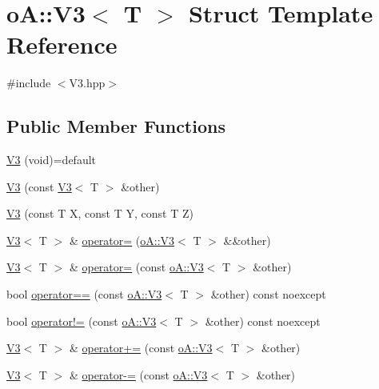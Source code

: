\hypertarget{structo_a_1_1_v3}{}\section{oA\+:\+:V3$<$ T $>$ Struct Template Reference}
\label{structo_a_1_1_v3}


{\ttfamily \#include $<$V3.\+hpp$>$}

\subsection*{Public Member Functions}
\begin{DoxyCompactItemize}
\item 
\mbox{\hyperlink{structo_a_1_1_v3_af7d2e9a3d4eecae6bdd7adf7dd1a691b}{V3}} (void)=default
\item 
\mbox{\hyperlink{structo_a_1_1_v3_a8020feb017daf4289ee5f1b06d3ff952}{V3}} (const \mbox{\hyperlink{structo_a_1_1_v3}{V3}}$<$ T $>$ \&other)
\item 
\mbox{\hyperlink{structo_a_1_1_v3_a528741444df16de6e4839338ec9d2cf0}{V3}} (const T X, const T Y, const T Z)
\item 
\mbox{\hyperlink{structo_a_1_1_v3}{V3}}$<$ T $>$ \& \mbox{\hyperlink{structo_a_1_1_v3_a87a850c59abfbf1ad9fbaa15865e24fe}{operator=}} (\mbox{\hyperlink{structo_a_1_1_v3}{o\+A\+::\+V3}}$<$ T $>$ \&\&other)
\item 
\mbox{\hyperlink{structo_a_1_1_v3}{V3}}$<$ T $>$ \& \mbox{\hyperlink{structo_a_1_1_v3_acd2b2489386aa3c917d2b843602da1a8}{operator=}} (const \mbox{\hyperlink{structo_a_1_1_v3}{o\+A\+::\+V3}}$<$ T $>$ \&other)
\item 
bool \mbox{\hyperlink{structo_a_1_1_v3_a1291b33d742ccbc7e5b30466c6baa50d}{operator==}} (const \mbox{\hyperlink{structo_a_1_1_v3}{o\+A\+::\+V3}}$<$ T $>$ \&other) const noexcept
\item 
bool \mbox{\hyperlink{structo_a_1_1_v3_ab5f276b206d63965cf0ce028af40363f}{operator!=}} (const \mbox{\hyperlink{structo_a_1_1_v3}{o\+A\+::\+V3}}$<$ T $>$ \&other) const noexcept
\item 
\mbox{\hyperlink{structo_a_1_1_v3}{V3}}$<$ T $>$ \& \mbox{\hyperlink{structo_a_1_1_v3_ac69717bc685dc757a3e11566bdc9da00}{operator+=}} (const \mbox{\hyperlink{structo_a_1_1_v3}{o\+A\+::\+V3}}$<$ T $>$ \&other)
\item 
\mbox{\hyperlink{structo_a_1_1_v3}{V3}}$<$ T $>$ \& \mbox{\hyperlink{structo_a_1_1_v3_a631255b2f80594b99423a807e1846df2}{operator-\/=}} (const \mbox{\hyperlink{structo_a_1_1_v3}{o\+A\+::\+V3}}$<$ T $>$ \&other)

\end{DoxyCompactItemize}
